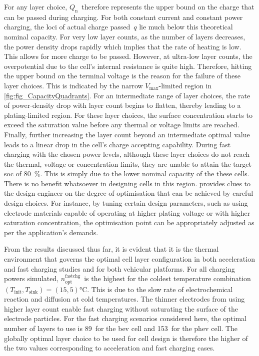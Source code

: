 For any layer  choice, $Q_\text{n}$~therefore represents the upper  bound on the
charge  that can  be  passed  during charging.  For  both  constant current  and
constant power  charging, the loci of  actual charge passed~$q$ lie  much below
this theoretical nominal  capacity. For very low layer counts,  as the number of
layers decreases, the power density drops rapidly which implies that the rate of
heating is low. This allows for more  charge to be passed. However, at ultra-low
layer counts, the  overpotential due to the cell's internal  resistance is quite
high.  Therefore,  hitting the  upper  bound  on  the  terminal voltage  is  the
reason  for  the failure  of  these  layer choices.  This  is  indicated by  the
narrow \mbox{$V_\text{max}$-limited} region in \cref{fig:fig_CapacityQuadrants}. For an
intermediate range of  layer choices, the rate of power-density  drop with layer
count begins to flatten, thereby leading  to a plating-limited region. For these
layer choices, the  surface concentration starts to exceed  the saturation value
before any  thermal or voltage  limits are reached. Finally,  further increasing
the layer count beyond  an intermediate optimal value leads to  a linear drop in
the cell's  charge accepting  capability. During fast  charging with  the chosen
power levels, although these layer choices  do not reach the thermal, voltage or
concentration  limits,  they  are  unable  to attain  the  target  \gls{soc}  of
\SI{80}{\percent}. This is simply due to the lower nominal capacity of the these
cells.  There is  no  benefit  whatsoever in  designing  cells  in this  region.
 provides  clues to  the design engineer  on the
degree  of optimisation  that can  be achieved  by careful  design choices.  For
instance, by tuning certain design parameters, such as using electrode materials
capable  of  operating at  higher  plating  voltage  or with  higher  saturation
concentration, the optimisation  point can be appropriately adjusted  as per the
application's demands.


From  the results  discussed thus  far, it  is evident  that it  is the  thermal
environment  that  governs   the  optimal  cell  layer   configuration  in  both
acceleration and fast charging studies and for both vehicular platforms. For all
charging powers simulated, $n^\text{fastchg}_\text{opt}$~is the highest for the
coldest temperature  combination~${(T_\text{init},T_\text{sink}) =  (15, 5)
\si{\degreeCelsius}}$. This is due to  the slow rate of electrochemical reaction
and diffusion  at cold  temperatures. The thinner  electrodes from  using higher
layer count enable fast charging without saturating the surface of the electrode
particles. For the  fast charging scenarios considered here,  the optimal number
of layers to use  is 89~for the \gls{bev} cell and  153~for the \gls{phev} cell.
The globally optimal  layer choice to be  used for cell design  is therefore the
higher of the two values corresponding  to acceleration and fast charging cases.

